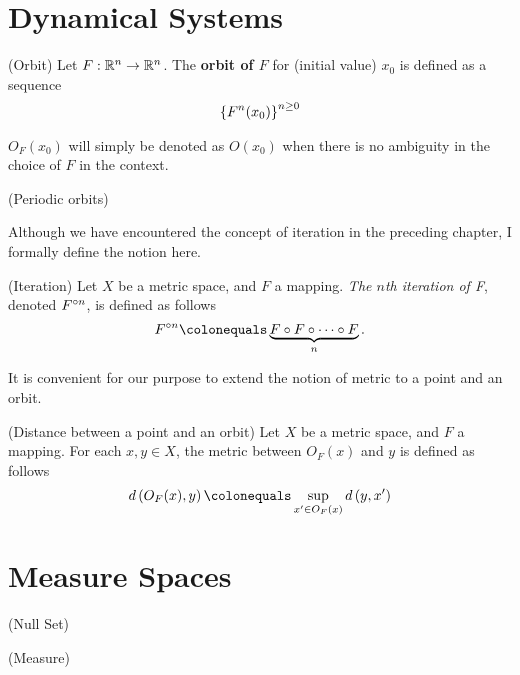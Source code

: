 \documentclass[12pt,twoside,draft]{book}
\begin{document}
\section{Dynamical Systems}

\begin{definition}
  (Orbit)
  Let $F: \mathbb{R}^n \to \mathbb{R}^n$. 
  The \textbf{orbit of $F$} for (initial value) $x_0$ is defined as a sequence
  \begin{equation*}
    \left \{ F^n(x_0) \right \}^{n\geq 0}_{ }
  \end{equation*}
  \label{def:orbit}
\end{definition}
$O_F(x_0)$ will simply be denoted as $O(x_0)$ when there is no ambiguity in the choice of $F$ in the context.

\begin{definition}
  (Periodic orbits)
  \label{def:porbit}
\end{definition}

Although we have encountered the concept of iteration in the preceding chapter, I formally define the notion here.
\begin{definition}
  (Iteration)
  Let $X$ be a metric space, and $F$ a mapping.
  \textit{The $n$th iteration of F}, denoted $F^{\circ n}$, is defined as follows
  \begin{equation*}
    \itr{F}{n} \ceq \underbrace{F \circ F \circ \cdots \circ F}_{n} .
  \end{equation*}
\end{definition}
%
It is convenient for our purpose to extend the notion of metric to a point and an orbit.
\begin{definition}
  (Distance between a point and an orbit)
  Let $X$ be a metric space, and $F$ a mapping.
  For each $x,y \in X$, the metric between $O_F(x)$ and $y$ is defined as follows
  \begin{equation*}
    \metric{O_F(x),y} \ceq \sup\limits_{x' \in O_F(x)} \metric{y,x'}
  \end{equation*}
\end{definition}

\section{Measure Spaces}
\begin{definition}
  (Null Set)
\end{definition}
\begin{definition}
  (Measure)
\end{definition}




\printindex
\end{document}
